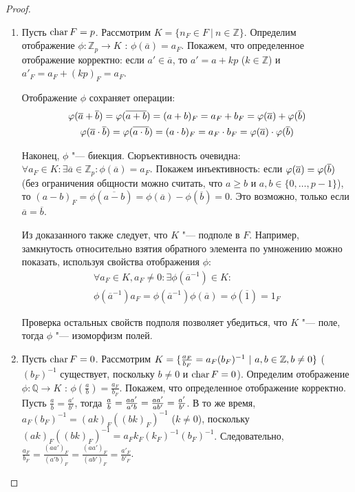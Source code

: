\begin{proof}~
	\begin{enumerate}
		\item Пусть $\operatorname{char}{F} = p$. Рассмотрим $K = \{n_F \in F~|~n \in \mathbb{Z}\}$. Определим отображение $\phi: \mathbb{Z}_p \rightarrow K$ : $\phi(\overline{a}) = a_F$. Покажем, что определенное отображение корректно: если $a' \in \overline{a}$, то $a' = a + kp$ ($k \in \mathbb{Z}$) и $a'_F = a_F + (kp)_F = a_F$.
		
		Отображение $\phi$ сохраняет операции:
		\begin{gather*}
			\phi(\overline{a} + \overline{b}) = \phi(\overline{a + b}) \hm{=} (a+b)_F = a_F + b_F = \phi(\overline{a}) + \phi(\overline{b})\\
			\phi(\overline{a} \cdot \overline{b}) = \phi(\overline{a \cdot b}) = (a \cdot b)_F \hm{=} a_F \cdot b_F = \phi(\overline{a}) \cdot \phi(\overline{b})
		\end{gather*}
		
		Наконец, $\phi$ "--- биекция. Сюръективность очевидна: $\forall a_F \in K: \exists \overline{a} \in \mathbb{Z}_p: \phi(\overline{a}) = a_F$. Покажем инъективность: если $\phi(\overline{a}) \hm{=} \phi(\overline{b})$ (без ограничения общности можно считать, что $a \ge b$ и $a, b \in \{0,\dots, p-1\}$), то $(a - b)_F = \phi(\overline{a - b}) = \phi(\overline{a}) - \phi(\overline{b}) = 0$. Это возможно, только если $\overline{a} = \overline{b}$.
		
		Из доказанного также следует, что $K$ "--- подполе в $F$. Например, замкнутость относительно взятия обратного элемента по умножению можно показать, используя свойства отображения $\phi$:
		\begin{multline*}
		\forall a_F \in K, a_F \ne 0 : \exists \phi(\overline{a}^{-1}) \in K:\\
		\phi(\overline{a}^{-1}) a_F = \phi(\overline{a}^{-1})\phi(\overline{a}) = \phi(\overline{1}) = 1_F
		\end{multline*}
		
		Проверка остальных свойств подполя позволяет убедиться, что $K$ "--- поле, тогда $\phi$ "--- изоморфизм полей.
	
		\item Пусть $\operatorname{char}{F} = 0$. Рассмотрим $K = \{\frac{a_F}{b_F}=a_F(b_F)^{-1}~|~a, b \hm{\in} \mathbb{Z}, b \ne 0\}$ ($(b_F)^{-1}$ существует, поскольку $b \ne 0$ и $\operatorname{char}{F} = 0$). Определим отображение $\phi: \mathbb{Q} \rightarrow K$ : $\phi\left(\frac{a}{b}\right) = \frac{a_F}{b_F}$. Покажем, что определенное отображение корректно. Пусть $\frac{a}{b} = \frac{a'}{b'}$, тогда $\frac{a}{b} \hm{=} \frac{aa'}{a'b} \hm{=} \frac{aa'}{ab'} = \frac{a'}{b'}$. В то же время, $a_F(b_F)^{-1} = (ak)_F((bk)_F)^{-1}$ ($k \ne 0$), поскольку $(ak)_F((bk)_F)^{-1} = a_Fk_F(k_F)^{-1}(b_F)^{-1}$. Следовательно, $\frac{a_F}{b_F} = \frac{(aa')_F}{(a'b)_F} = \frac{(aa')_F}{(ab')_F} = \frac{a'_F}{b'_F}$.
		

\end{enumerate}
\end{proof}
